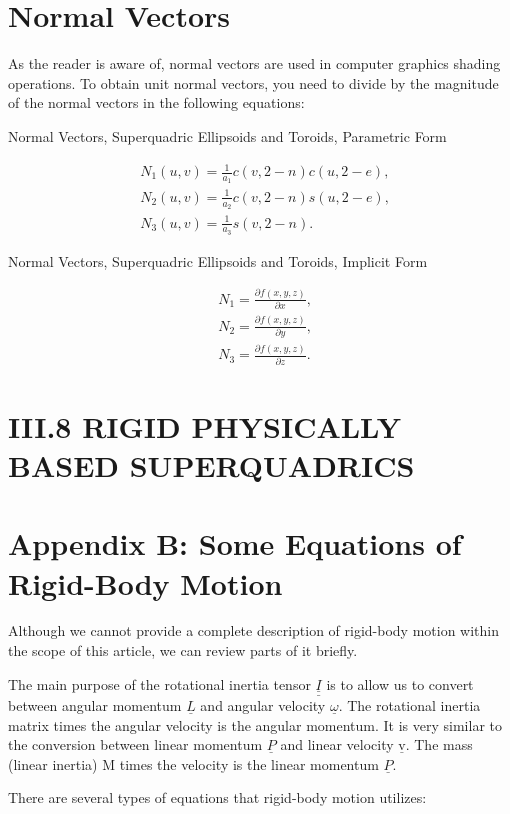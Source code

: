 \section{Normal Vectors}
As the reader is aware of, normal vectors are used in computer graphics shading operations. To obtain unit normal vectors, you need to divide by the magnitude of the normal vectors in the following equations:

Normal Vectors, Superquadric Ellipsoids and Toroids, Parametric Form

$$
\begin{aligned}
&N_{1}(u, v)=\frac{1}{a_{1}} c(v, 2-n) c(u, 2-e), \\
&N_{2}(u, v)=\frac{1}{a_{2}} c(v, 2-n) s(u, 2-e), \\
&N_{3}(u, v)=\frac{1}{a_{3}} s(v, 2-n) .
\end{aligned}
$$

Normal Vectors, Superquadric Ellipsoids and Toroids, Implicit Form

$$
\begin{aligned}
&N_{1}=\frac{\partial f(x, y, z)}{\partial x}, \\
&N_{2}=\frac{\partial f(x, y, z)}{\partial y}, \\
&N_{3}=\frac{\partial f(x, y, z)}{\partial z} .
\end{aligned}
$$

\section{III.8 RIGID PHYSICALLY BASED SUPERQUADRICS}
\section{Appendix B: Some Equations of Rigid-Body Motion}
Although we cannot provide a complete description of rigid-body motion within the scope of this article, we can review parts of it briefly.

The main purpose of the rotational inertia tensor $\underline{\underline{I}}$ is to allow us to convert between angular momentum $\underline{L}$ and angular velocity $\underline{\omega}$. The rotational inertia matrix times the angular velocity is the angular momentum. It is very similar to the conversion between linear momentum $\underline{P}$ and linear velocity $\underline{\mathrm{v}}$. The mass (linear inertia) $\mathrm{M}$ times the velocity is the linear momentum $\underline{P}$.

There are several types of equations that rigid-body motion utilizes:

